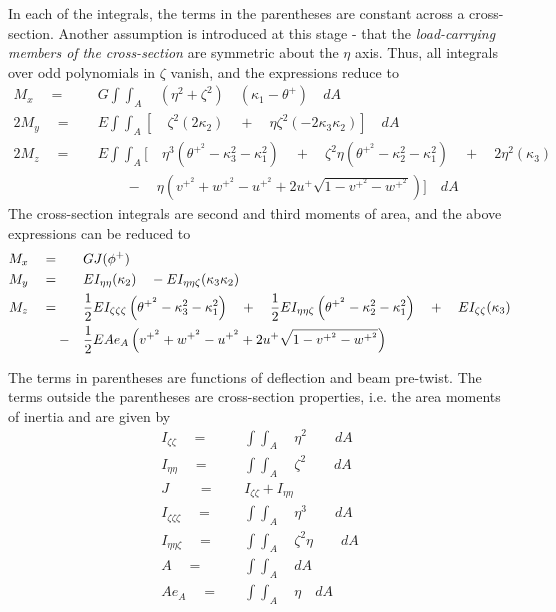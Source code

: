 \vspace{0.3cm}
In each of the integrals, the terms in the parentheses are constant across a cross-section. Another assumption is introduced at this stage - that the \emph{load-carrying members of the cross-section} are symmetric about the $\eta$ axis. Thus, all integrals over odd polynomials in $\zeta$ vanish, and the expressions reduce to 
\begin{align*}
M_x \quad = \quad & G \int \int_A \quad (\eta^2 + \zeta^2) \quad (\kappa_1 - \theta^+ )\quad dA \\
2 M_y \quad = \quad & E \int \int_A [\quad \zeta^2(2 \kappa_2) \quad + \quad \eta \zeta^2 (-2 \kappa_3 \kappa_2)] \quad dA \\
2 M_z \quad = \quad & E \int \int_A [\quad \eta^3 \left(\theta^{+^2} - \kappa_3^2-\kappa_1^2\right) \quad + \quad \zeta^2 \eta  \left(\theta^{+^2} - \kappa_2^2 - \kappa_1^2\right) \quad + \quad 2 \eta^2 (\kappa_3) \\
& \qquad - \quad \eta \left(v^{+^2} + w^{+^2} - u^{+^2} + 2 u^+ \sqrt{1-v^{+^2}-w^{+^2}}\right) ] \quad dA
\end{align*}
\vspace{0.3cm}
The cross-section integrals are second and third moments of area, and the above expressions can be reduced to 
\begin{align}
\label{eqn:StrlMoment}
M_x \quad = \quad \quad & G J (\phi^+) \notag \\
M_y \quad = \quad \quad &E I_{\eta \eta} (\kappa_2) \quad - E I_{\eta \eta \zeta} (\kappa_3 \kappa_2) \notag \\
M_z \quad = \quad \quad &\frac{1}{2} E I_{\zeta \zeta \zeta} \left(\theta^{+^2} - \kappa_3^2 - \kappa_1^2\right) \quad + \quad \frac{1}{2} E I_{\eta \eta \zeta} \left(\theta^{+^2} - \kappa_2^2-\kappa_1^2\right) \quad + \quad E I_{\zeta \zeta} (\kappa_3) \notag \\
- \quad & \frac{1}{2} E A e_A \left(v^{+^2} + w^{+^2} - u^{+^2} + 2 u^+ \sqrt{1-v^{+^2}-w^{+^2}}\right)
\end{align}

The terms in parentheses are functions of deflection and beam  pre-twist. The terms outside the parentheses are cross-section properties, i.e. the area moments of inertia and are given by 
\begin{align*}
I_{\zeta \zeta} \quad = \quad & \int \int_A \quad \eta^2 \quad  \quad dA \\
I_{\eta \eta} \quad = \quad & \int \int_A \quad \zeta^2 \quad  \quad dA \\
J \quad \quad = \quad & I_{\zeta \zeta} + I_{\eta \eta} \\
I_{\zeta \zeta \zeta} \quad = \quad & \int \int_A \quad \eta^3 \quad  \quad dA \\
I_{\eta \eta \zeta} \quad = \quad & \int \int_A \quad \zeta^2 \eta \quad  \quad dA \\
A \quad = \quad & \int \int_A \quad dA \\
A e_A \quad = \quad & \int \int_A \quad \eta \quad dA
\end{align*}

